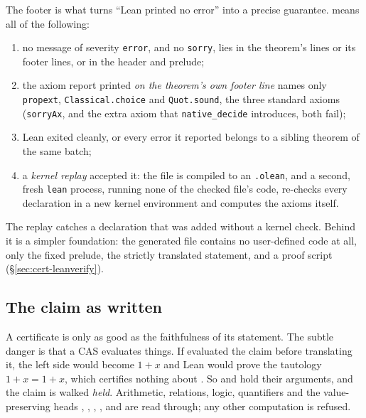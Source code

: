 
The footer is what turns ``Lean printed no error'' into a precise
guarantee.  means all of
the following:
\begin{enumerate}
\item no message of severity \texttt{error}, and no \texttt{sorry}, lies in the
  theorem's lines or its footer lines, or in the header and prelude;
\item the axiom report printed \emph{on the theorem's own footer line} names only
  \texttt{propext}, \texttt{Classical.choice} and \texttt{Quot.sound}, the three
  standard axioms (\texttt{sorryAx}, and the extra axiom that \texttt{native\_decide}
  introduces, both fail);
\item Lean exited cleanly, or every error it reported belongs to a sibling theorem of
  the same batch;
\item a \emph{kernel replay} accepted it: the file is
  compiled to an \texttt{.olean}, and a second, fresh \texttt{lean} process, running
  none of the checked file's code, re-checks every declaration in a new kernel
  environment and computes the axioms itself.
\end{enumerate}
The replay catches a declaration that was added without a kernel check. Behind it is
a simpler foundation: the generated file contains no user-defined code at all, only
the fixed prelude, the strictly translated statement, and a proof script
(\S\ref{sec:cert-leanverify}).

\subsection{The claim as written}
\label{ssec:cert-as-written}

A certificate is only as good as the faithfulness of its statement. The subtle danger
is that a CAS evaluates things. If  evaluated the claim
 before translating it, the left side
would become \(1+x\) and Lean would prove the tautology \(1+x=1+x\), which certifies
nothing about . So  and  hold their
arguments, and the claim is walked \emph{held}.
Arithmetic, relations, logic, quantifiers and the value-preserving heads ,
, , ,  and  are read through; any
other computation is refused.

